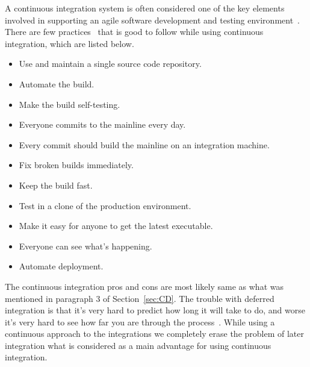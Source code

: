 \documentclass[12pt,a4paper]{article}
\theoremstyle{definition}
\begin{document}
        A continuous integration system is often considered one of the key elements involved in supporting an agile software development and testing environment~\cite{5261055}. There are few practices~\cite{ci2} that is good to follow while using continuous integration, which are listed below.\\[-4mm]

        \begin{itemize}
            \item Use and maintain a single source code repository.\\[-8mm]
            \item Automate the build.\\[-8mm]
            \item Make the build self-testing.\\[-8mm]
            \item Everyone commits to the mainline every day.\\[-8mm]
            \item Every commit should build the mainline on an integration machine.\\[-8mm]
            \item Fix broken builds immediately.\\[-8mm]
            \item Keep the build fast.\\[-8mm]
            \item Test in a clone of the production environment.\\[-8mm]
            \item Make it easy for anyone to get the latest executable.\\[-8mm]
            \item Everyone can see what's happening.\\[-8mm]
            \item Automate deployment.\\[-4mm]
        \end{itemize}

        The continuous integration pros and cons are most likely same as what was mentioned in paragraph 3 of Section~\ref{sec:CD}. The trouble with deferred integration is that it's very hard to predict how long it will take to do, and worse it's very hard to see how far you are through the process~\cite{ci2}. While using a continuous approach to the integrations we completely erase the problem of later integration what is considered as a main advantage for using continuous integration.
\end{document}
